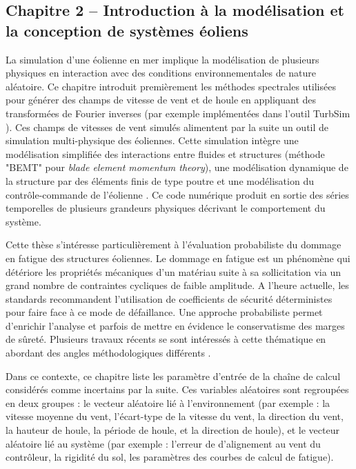 \subsection*{Chapitre 2 -- Introduction à la modélisation et la conception de systèmes éoliens}

La simulation d'une éolienne en mer implique la modélisation de plusieurs physiques en interaction avec des conditions environnementales de nature aléatoire. 
Ce chapitre introduit premièrement les méthodes spectrales utilisées pour générer des champs de vitesse de vent et de houle en appliquant des transformées de Fourier inverses (par exemple implémentées dans l'outil TurbSim \citep{turbsim_2009}). 
Ces champs de vitesses de vent simulés alimentent par la suite un outil de simulation multi-physique des éoliennes. 
Cette simulation intègre une modélisation simplifiée des interactions entre fluides et structures (méthode "BEMT" pour \textit{blade element momentum theory}), une modélisation dynamique de la structure par des éléments finis de type poutre et une modélisation du contrôle-commande de l'éolienne \cite{milano_thesis_2021}. 
Ce code numérique produit en sortie des séries temporelles de plusieurs grandeurs physiques décrivant le comportement du système.

Cette thèse s'intéresse particulièrement à l'évaluation probabiliste du dommage en fatigue des structures éoliennes. 
Le dommage en fatigue est un phénomène qui détériore les propriétés mécaniques d'un matériau suite à sa sollicitation via un grand nombre de contraintes cycliques de faible amplitude. 
A l'heure actuelle, les standards \cite{iec_2019,dnv_loads_2016} recommandent l'utilisation de coefficients de sécurité déterministes pour faire face à ce mode de défaillance. 
Une approche probabiliste permet d'enrichir l'analyse et parfois de mettre en évidence le conservatisme des marges de sûreté. 
Plusieurs travaux récents se sont intéressés à cette thématique en abordant des angles méthodologiques différents \citep{huchet_2019,lataniotis_2019,cousin_2021,hirvoas_2021,petrovska_2022}.

Dans ce contexte, ce chapitre liste les paramètre d'entrée de la chaîne de calcul considérés comme incertains par la suite. 
Ces variables aléatoires sont regroupées en deux groupes : le vecteur aléatoire lié à l'environnement (par exemple : la vitesse moyenne du vent, l'écart-type de la vitesse du vent, la direction du vent, la hauteur de houle, la période de houle, et la direction de houle), et le vecteur aléatoire lié au système (par exemple : l'erreur de d'alignement au vent du contrôleur, la rigidité du sol, les paramètres des courbes de calcul de fatigue).


